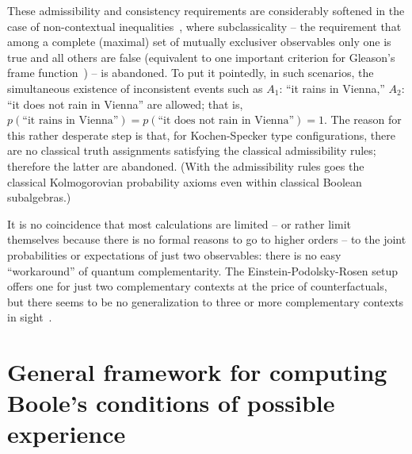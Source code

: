 \documentclass[%
  twocolumn,
 showpacs,
 showkeys,
 preprintnumbers,
 amsmath,amssymb,
 aps,
  pra,
  longbibliography,
 floatfix,
 ]{revtex4-1}
\begin{document}
These admissibility and consistency requirements are considerably softened in the case of non-contextual inequalities~\cite{cabello:210401},
where subclassicality
-- the requirement that among a complete (maximal) set of mutually exclusiver observables only one is true and all others are false
(equivalent to one important criterion for Gleason's frame function~\cite{Gleason})
--
is abandoned.
To put it pointedly, in such scenarios, the simultaneous existence of inconsistent events such as
$A_1$: ``it rains in Vienna,''
$A_2$: ``it does not rain in Vienna''
are allowed; that is,
$p(\text{``it rains in Vienna''}) = p(\text{``it does not rain in Vienna''}) =1$.
The reason for this rather desperate step is that, for Kochen-Specker type configurations,
there are no classical truth assignments satisfying the classical admissibility rules;
therefore the latter are abandoned.
(With the admissibility rules goes the classical Kolmogorovian probability axioms even within classical Boolean subalgebras.)


It is no coincidence that most calculations are limited -- or rather limit themselves because there is no formal reasons to go to higher orders
--
to the joint probabilities or expectations of just two observables:
there is no easy ``workaround'' of quantum complementarity.
The Einstein-Podolsky-Rosen setup~\cite{epr}
offers one for just two complementary contexts at the price of counterfactuals,
but there seems to be no generalization to three or more complementary contexts in sight~\cite{schimpf-svozil}.


\section{General framework for computing Boole's conditions of possible experience}
\label{2017-b-gfcbcpe}
\end{document}

